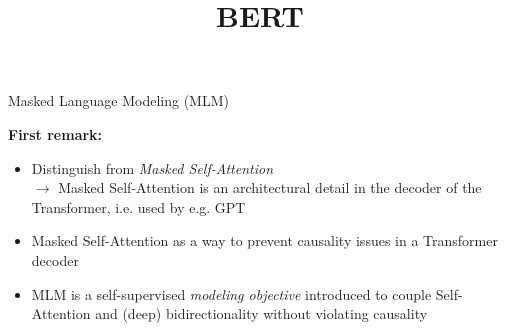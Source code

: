 



\newcommand{\titlefigure}{figure/bert.jpeg}
\newcommand{\learninggoals}{
\item Know the pre-training tasks
\item How to construct samples
\item Understand the pre-training
\item Gain understanding of the fine-tuning procedure
\item Differences between token- and sequence classification}

\title{BERT}
\date{}




\begin{frame}{Masked Language Modeling (MLM)}

\vfill

\textbf{First remark:}

\begin{itemize}
	\item Distinguish from \textit{Masked Self-Attention}\\ 
				$\to$ Masked Self-Attention is an architectural detail in the decoder of the Transformer, i.e. used by e.g. GPT
	\item Masked Self-Attention as a way to prevent causality issues in a Transformer decoder 
	\item MLM is a self-supervised \textit{modeling objective} introduced to couple Self-Attention and (deep) bidirectionality without violating causality
\end{itemize}

\vfill

\end{frame}


